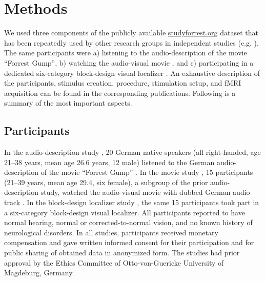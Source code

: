 \documentclass[english]{article}
\begin{document}
\section{Methods}


We used three components of the publicly available
\href{http://www.studyforrest.org}{studyforrest.org} dataset that has
been repeatedly used by other research groups in independent studies (e.g.
\citep{ben2018hippocampal, jiahui2019predicting, hu2017decoding,
lettieri2019emotionotopy, nguyen2016integration}).
The same participants were
a) listening to the audio-description \citep{hanke2014audiomovie} of
the movie ``Forrest Gump'',
b) watching the audio-visual movie \citep{hanke2016simultaneous}, and
c) participating in a dedicated six-category block-design visual localizer \citep{sengupta2016extension}.
An exhaustive description of the participants, stimulus creation, procedure,
stimulation setup, and fMRI acquisition can be found in the corresponding
publications. Following is a summary of the most important aspects.


\subsection{Participants}
In the audio-description study \citep{hanke2014audiomovie}, 20 German native
speakers (all right-handed, age 21–38 years, mean age 26.6 years, 12 male)
listened to the German audio-description \citep{ForrestGumpGermanAD} of the
movie ``Forrest Gump'' \citep{ForrestGumpMovie}.
In the movie study \citep{hanke2016simultaneous}, 15 participants (21–39 years,
mean age 29.4, six female), a subgroup of the prior audio-description study,
watched the audio-visual movie with dubbed German audio track
\citep{ForrestGumpDVD}.
In the block-design localizer study \citep{sengupta2016extension}, the same 15
participants took part in a six-category block-design visual localizer.
All participants reported to have normal hearing, normal or corrected-to-normal
vision, and no known history of neurological disorders.
In all studies, participants received monetary compensation and gave written
informed consent for their participation and for public sharing of obtained data
in anonymized form. The studies had prior approval by the Ethics Committee of
Otto-von-Guericke University of Magdeburg, Germany.
\end{document}
